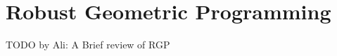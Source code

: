 \section{Robust Geometric Programming}
TODO by Ali: A Brief review of RGP
\begin{comment}
\subsection{Decoupled Form}
WOLG the objective function could be assumed linear (one dimensional variable) and
deprived of any data (epigraph formulation), therefore the cost will be ignored throughout this report.
Moreover, the GP will be represented as follows

\begin{equation}
\begin{aligned}
\textstyle{\sum}_{k=1}^{K_i}e^{\vec{a}_{ik}\vec{x} + b_{ik}} &\leq 1 &&\forall i \in \mathbf{P}\\
e^{\vec{a}_{i1}\vec{x} + b_{i1}} + e^{\vec{a}_{i2}\vec{x} + b_{i2}} &\leq 1 &&\forall i \in \mathbf{M}\\
e^{\vec{a}_{i1}\vec{x} + b_{i1}} &\leq 1 &&\forall i \in \mathbf{N}
\end{aligned}
\label{GP_decoupled}
\end{equation}

where
\begin{itemize}
\item $\mathbf{P}$ = $\left\{i : \vec{K}_i > 2\right\}$
\item $\mathbf{N}$ = $\left\{i : \vec{K}_i = 2\right\}$
\item $\mathbf{M}$ = $\left\{i : \vec{K}_i = 1\right\}$
\end{itemize}

The GP in equation \eqref{GP_decoupled} in convex form is represented as follows


\end{comment}
